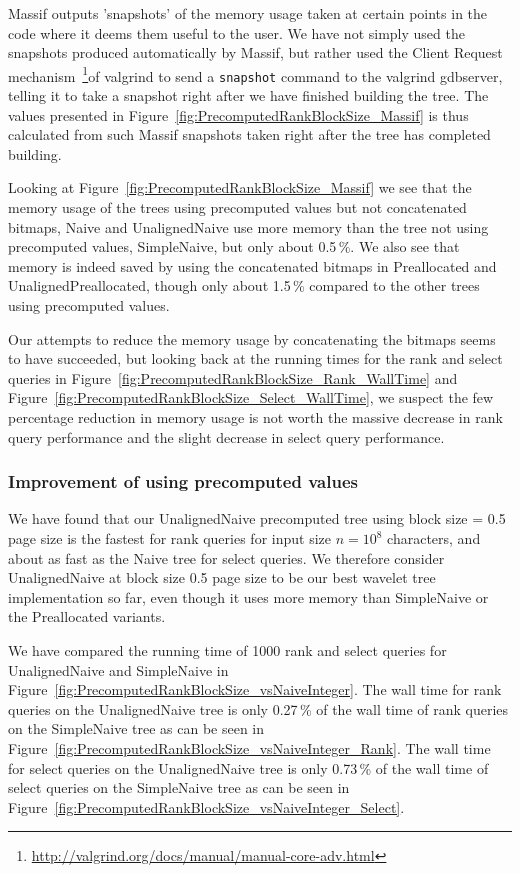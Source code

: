 Massif outputs 'snapshots' of the memory usage taken at certain points in the code where it deems them useful to the user.
We have not simply used the snapshots produced automatically by Massif, but rather used the Client Request mechanism~\footnote{\url{http://valgrind.org/docs/manual/manual-core-adv.html}}of valgrind to send a \texttt{snapshot} command to the valgrind gdbserver, telling it to take a snapshot right after we have finished building the tree.
The values presented in Figure~\ref{fig:PrecomputedRankBlockSize_Massif} is thus calculated from such Massif snapshots taken right after the tree has completed building.

Looking at Figure~\ref{fig:PrecomputedRankBlockSize_Massif} we see that the memory usage of the trees using precomputed values but not concatenated bitmaps, Naive and UnalignedNaive use more memory than the tree not using precomputed values, SimpleNaive, but only about 0.5\,\%.
We also see that memory is indeed saved by using the concatenated bitmaps in Preallocated and UnalignedPreallocated, though only about 1.5\,\% compared to the other trees using precomputed values.

Our attempts to reduce the memory usage by concatenating the bitmaps seems to have succeeded, but looking back at the running times for the rank and select queries in Figure~\ref{fig:PrecomputedRankBlockSize_Rank_WallTime} and Figure~\ref{fig:PrecomputedRankBlockSize_Select_WallTime}, we suspect the few percentage reduction in memory usage is not worth the massive decrease in rank query performance and the slight decrease in select query performance.


\subsubsection{Improvement of using precomputed values}
We have found that our UnalignedNaive precomputed tree using block size = 0.5 page size is the fastest for rank queries for input size $n = 10^8$ characters, and about as fast as the Naive tree for select queries.
We therefore consider UnalignedNaive at block size 0.5 page size to be our best wavelet tree implementation so far, even though it uses more memory than SimpleNaive or the Preallocated variants.

We have compared the running time of 1000 rank and select queries for UnalignedNaive and SimpleNaive in Figure~\ref{fig:PrecomputedRankBlockSize_vsNaiveInteger}.
The wall time for rank queries on the UnalignedNaive tree is only 0.27\,\% of the wall time of rank queries on the SimpleNaive tree as can be seen in Figure~\ref{fig:PrecomputedRankBlockSize_vsNaiveInteger_Rank}.
The wall time for select queries on the UnalignedNaive tree is only 0.73\,\% of the wall time of select queries on the SimpleNaive tree as can be seen in Figure~\ref{fig:PrecomputedRankBlockSize_vsNaiveInteger_Select}.

